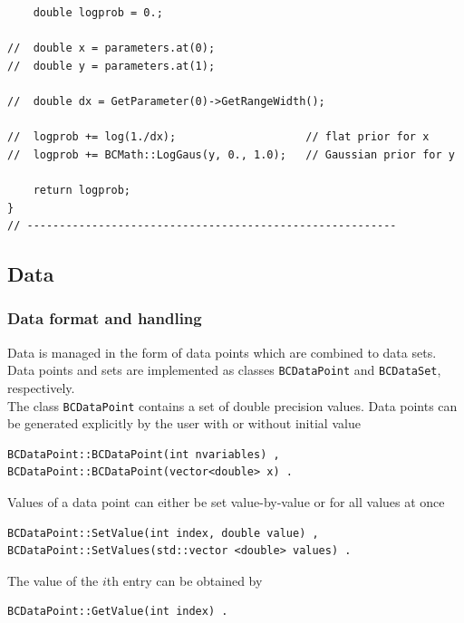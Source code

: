 \documentclass[11pt, a4paper]{article}
\begin{document}
\begin{verbatim}
	double logprob = 0.;

//	double x = parameters.at(0);
//	double y = parameters.at(1);

//	double dx = GetParameter(0)->GetRangeWidth(); 

//	logprob += log(1./dx);                    // flat prior for x
//	logprob += BCMath::LogGaus(y, 0., 1.0);   // Gaussian prior for y

	return logprob;
}
// ---------------------------------------------------------
\end{verbatim}


\subsection{Data}
\label{subsection:data}

\subsubsection{Data format and handling}
\label{subsection:dataformat}

Data is managed in the form of data points which are combined to data
sets. Data points and sets are implemented as classes
\verb|BCDataPoint| and \verb|BCDataSet|, respectively. \\

\noindent
The class \verb|BCDataPoint| contains a set of double precision
values. Data points can be generated explicitly by the user with or
without initial value
%
\begin{verbatim}
BCDataPoint::BCDataPoint(int nvariables) ,
BCDataPoint::BCDataPoint(vector<double> x) .
\end{verbatim}

\noindent
Values of a data point can either be set value-by-value or for all
values at once
%
\begin{verbatim}
BCDataPoint::SetValue(int index, double value) ,
BCDataPoint::SetValues(std::vector <double> values) .
\end{verbatim}

\noindent
The value of the $i$th entry can be obtained by
%
\begin{verbatim}
BCDataPoint::GetValue(int index) .
\end{verbatim}
\end{document}
